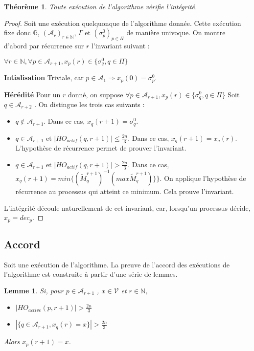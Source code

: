 \documentclass{article}
\newtheorem{lemma}{Lemme}
\newtheorem{theorem}{Théorème}
\begin{document}
\begin{theorem}
	Toute exécution de l'algorithme vérifie l'intégrité.
\end{theorem}
\begin{proof}
	Soit une exécution quelquonque de l'algorithme donnée. Cette exécution fixe donc $\mathds{G}$, $(\mathcal{A}_r)_{r \in \mathds{N}}$, $\Gamma$ et $(\sigma^0_p)_{p \in \Pi}$ de manière univoque.
	On montre d'abord par récurrence sur $r$ l'invariant suivant : 

	$  \forall r \in \mathds{N}, \forall p \in \mathcal{A}_{r+1}, x_p(r) \in \{\sigma^0_q, q \in \Pi\}$

\textbf{Intialisation}
	Triviale, car $p \in \mathcal{A}_1 \Rightarrow x_p(0) = \sigma^0_p$. 

\textbf{Hérédité}
	Pour un $r$ donné, on suppose $\forall p \in \mathcal{A}_{r+1}, x_p(r) \in \{\sigma^0_q, q \in \Pi\}$
	Soit $q \in \mathcal{A}_{r+2}$ . On distingue les trois cas suivants :
\begin{itemize}
	\item $q \notin \mathcal{A}_{r+1}$. Dans ce cas, $x_q(r+1) = \sigma^0_q$.
	\item $q \in \mathcal{A}_{r+1}$ et $|HO_{actif} (q, r+1) | \leq \frac{2 n}{3}$. Dans ce cas, $x_q(r+1) = x_q(r)$. L'hypothèse de récurrence permet de prouver l'invariant.
	\item $q \in \mathcal{A}_{r+1}$ et $|HO_{actif} (q, r+1) | >    \frac{2 n}{3}$. Dans ce cas, $x_q(r+1) = min \{(\widetilde{M}^{r+1}_q)^{-1} (max \widetilde{M}_q^{r+1})\}\}$.
		On applique l'hypothèse de récurrence au processus qui atteint ce minimum. Cela prouve l'invariant.

\end{itemize}

L'intégrité découle naturellement de cet invariant, car, lorsqu'un processus décide, $x_p = dec_p$.
\end{proof}

\subsection{Accord}

Soit une exécution de l'algorithme.
La preuve de l'accord des exécutions de l'algorithme est construite à partir d'une série de lemmes.

\begin{lemma}

	Si, pour $p \in \mathcal{A}_{r+1}$ , $x \in \mathcal{V}$ et $r \in \mathds{N}$, 

\begin{itemize}

	\item $| HO_{active} (p,r+1) | > \frac{2 n}{3}$
	\item $| \{ q \in \mathcal{A}_{r+1} , x_q(r) = x \} | > \frac{2 n}{3}$

\end{itemize}

Alors $x_p(r+1) = x$.

\end{lemma}
\end{document}
